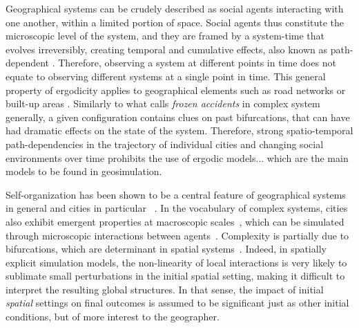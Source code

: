 \documentclass[3p,times,procedia]{elsarticle}
\begin{document}
Geographical systems can be crudely described as social agents interacting with one another, within a limited portion of space. Social agents thus constitute the microscopic level of the system, and they are framed by a system-time that evolves irreversibly, creating temporal and cumulative effects, also known as path-dependent \citep{arthur1994increasing}. Therefore, observing a system at different points in time does not equate to observing  different systems at a single point in time. This general property of ergodicity applies to geographical elements such as road networks or built-up areas \citep{pumain2003approche}. Similarly to what \citet{gell1995quark} calls \emph{frozen accidents} in complex system generally, a given configuration contains clues on past bifurcations, that can have had dramatic effects on the state of the system. Therefore, strong spatio-temporal path-dependencies in the trajectory of individual cities and changing social environments over time prohibits the use of ergodic models... which are the main models to be found in geosimulation.


Self-organization has been shown to be a central feature of geographical systems in general and cities in particular ~\citep{AllenSanglier1981,saint1989villes, Portugali2000}. In the vocabulary of complex systems, cities also exhibit emergent properties at macroscopic scales~\citep{pumain2006hierarchy, AzizAlaouiBertelle2009}, which can be simulated through microscopic interactions between agents~\citep{Wu2002, Batty2007}. Complexity is partially due to bifurcations, which are determinant in spatial systems~\citep{Wilson1981, Wilson2002}. Indeed, in spatially explicit simulation models, the non-linearity of local interactions is very likely to sublimate small perturbations in the initial spatial setting, making it difficult to interpret the resulting global structures. In that sense, the impact of initial \emph{spatial} settings on final outcomes is assumed to be significant just as other initial conditions, but of more interest to the geographer. \\
\end{document}
